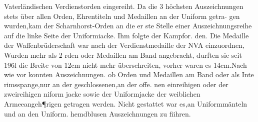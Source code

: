 Vaterländischen Verdienstorden eingereiht. Da die
3 höchsten Auszeichnungen stets über allen Orden,
Ehrentiteln und Medaillen an der Uniform getra-
gen wurden,kam der Scharnhorst-Orden an die er
ste Stelle einer Auszeichnungsreihe auf die linke
Seite der Uniformiacke. Ihm folgte der Kampfor.
den. Die Medaille der Waffenbrüderschaft war
nach der Verdienstmedaille der NVA einzuordnen,
Wurden mehr als 2 rden oder Medaillen am
Band angebracht, durften sie seit 196l die Breite
von 12cm nicht mehr überschreiten, vorher waren
es 14cm.Nach wie vor konnten Auszeichnungen.
ob Orden und Medaillen am Band oder als Inte
rimsspange,nur an der geschlossenen,an der offe.
nen einreihigen oder der zweireihigen niform
jacke sowie der Uniformjacke der weiblichen
Armeeangeh¶rigen getragen werden. Nicht gestattet
war es,an Uniformmänteln und an den Uniform.
hemdblusen Auszeichnungen zu fiihren.